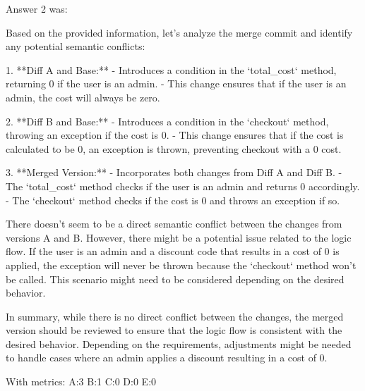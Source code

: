 Answer 2 was:
\begin{spverbatim}
Based on the provided information, let's analyze the merge commit and identify any potential semantic conflicts:

1. **Diff A and Base:**
   - Introduces a condition in the `total_cost` method, returning 0 if the user is an admin.
   - This change ensures that if the user is an admin, the cost will always be zero.

2. **Diff B and Base:**
   - Introduces a condition in the `checkout` method, throwing an exception if the cost is 0.
   - This change ensures that if the cost is calculated to be 0, an exception is thrown, preventing checkout with a 0 cost.

3. **Merged Version:**
   - Incorporates both changes from Diff A and Diff B.
   - The `total_cost` method checks if the user is an admin and returns 0 accordingly.
   - The `checkout` method checks if the cost is 0 and throws an exception if so.

There doesn't seem to be a direct semantic conflict between the changes from versions A and B. However, there might be a potential issue related to the logic flow. If the user is an admin and a discount code that results in a cost of 0 is applied, the exception will never be thrown because the `checkout` method won't be called. This scenario might need to be considered depending on the desired behavior.

In summary, while there is no direct conflict between the changes, the merged version should be reviewed to ensure that the logic flow is consistent with the desired behavior. Depending on the requirements, adjustments might be needed to handle cases where an admin applies a discount resulting in a cost of 0.
\end{spverbatim}

With metrics:
A:3
B:1
C:0
D:0
E:0

